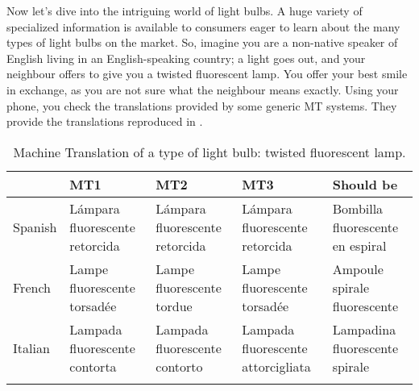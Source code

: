 \documentclass[output=paper]{langscibook}
\begin{document}
Now let’s dive into the intriguing world of light bulbs. A huge variety of specialized information is available to  consumers eager to learn about the many types of light bulbs on the market. So, imagine you are a non-native speaker of English living in an English-speaking country; a light goes out, and your neighbour offers to give you a twisted fluorescent lamp. You offer your best smile in exchange, as you are not sure what the neighbour means exactly. Using your phone, you check the translations provided by some generic MT systems. They provide the translations reproduced in . 


\begin{table}
\caption{Machine Translation of a type of light bulb: twisted fluorescent lamp.}
\label{tab:2:bulb}
\begin{tabularx}{\textwidth}{
p{}
p{}
p{}
p{}
p{}} \lsptoprule
 & {MT1} & {MT2} & {MT3} & {Should be} \\\midrule 
{Spanish} & L\'{a}mpara \newline fluorescente \newline retorcida & L\'{a}mpara \newline fluorescente \newline retorcida & L\'{a}mpara \newline fluorescente \newline retorcida & Bombilla \newline fluorescente \newline en espiral \\ \midrule 
{French} & Lampe \newline fluorescente \newline torsad\'{e}e & Lampe \newline fluorescente \newline tordue & Lampe \newline fluorescente \newline torsad\'{e}e & Ampoule \newline spirale \newline fluorescente \\\midrule
{Italian} & Lampada \newline fluorescente \newline contorta & Lampada \newline fluorescente \newline contorto & Lampada \newline fluorescente \newline attorcigliata & Lampadina \newline fluorescente \newline spirale \\\lspbottomrule 
\end{tabularx}
\end{table}
\end{document}
